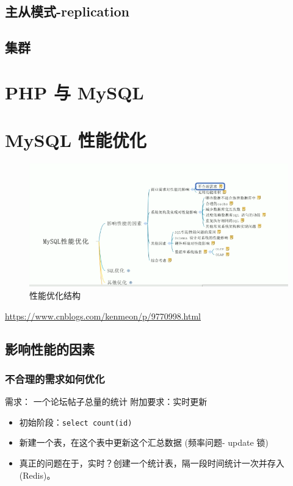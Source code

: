 \documentclass[UTF8,a4paper,12pt]{ctexbook}
\begin{document}
	\section{主从模式-replication}
	
	\section{集群}


\chapter{PHP 与 MySQL}


\chapter{MySQL 性能优化}
	\begin{figure}[H]
		\centering
		\includegraphics[scale=0.7]{xingNeng}
		\caption{性能优化结构}
	\end{figure}
	
	
	\url{https://www.cnblogs.com/kenmeon/p/9770998.html}
	
	
	\section{影响性能的因素}
		\subsection{不合理的需求如何优化}
			需求： 一个论坛帖子总量的统计
			附加要求：实时更新
			
			\begin{itemize}
				\item 初始阶段：\verb|select count(id)|
				\item 新建一个表，在这个表中更新这个汇总数据 (频率问题- update 锁)
				\item 真正的问题在于，实时？创建一个统计表，隔一段时间统计一次并存入(Redis)。
			\end{itemize}
		
\end{document}
